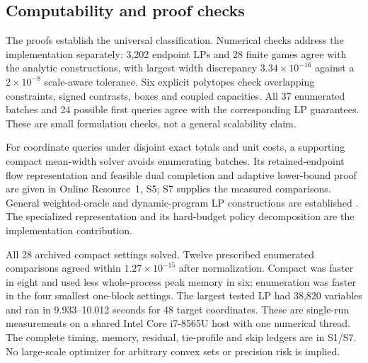 \documentclass[12pt]{article}
\begin{document}
\subsection{Computability and proof checks}
The proofs establish the universal classification. Numerical checks address
the implementation separately: 3,202 endpoint LPs and 28 finite games agree
with the analytic constructions, with largest width discrepancy
$3.34\times10^{-16}$ against a $2\times10^{-8}$ scale-aware tolerance.
Six explicit polytopes check overlapping constraints, signed contrasts,
boxes and coupled capacities. All 37 enumerated batches and 24 possible
first queries agree with the corresponding LP guarantees. These are small
formulation checks, not a general scalability claim.

For coordinate queries under disjoint exact totals and unit costs, a
supporting compact mean-width solver avoids enumerating batches.
Its retained-endpoint flow representation and feasible dual completion
and adaptive lower-bound proof are given in Online Resource~1, S5;
S7 supplies the measured comparisons. General weighted-oracle
and dynamic-program LP constructions are established
\citep{kawase2024,martin1990}. The specialized representation and its
hard-budget policy decomposition are the implementation contribution.

All 28 archived compact settings solved. Twelve prescribed enumerated
comparisons agreed within $1.27\times10^{-15}$ after normalization.
Compact was faster in eight and used less whole-process peak memory in
six; enumeration was faster in the four smallest one-block settings.
The largest tested LP had 38,820 variables and ran in 9.933--10.012 seconds
for 48 target coordinates. These are single-run measurements on a shared
Intel Core i7-8565U host with one numerical thread. The complete timing,
memory, residual, tie-profile and skip ledgers are in S1/S7.
No large-scale optimizer for arbitrary convex sets or precision risk is implied.
\end{document}
